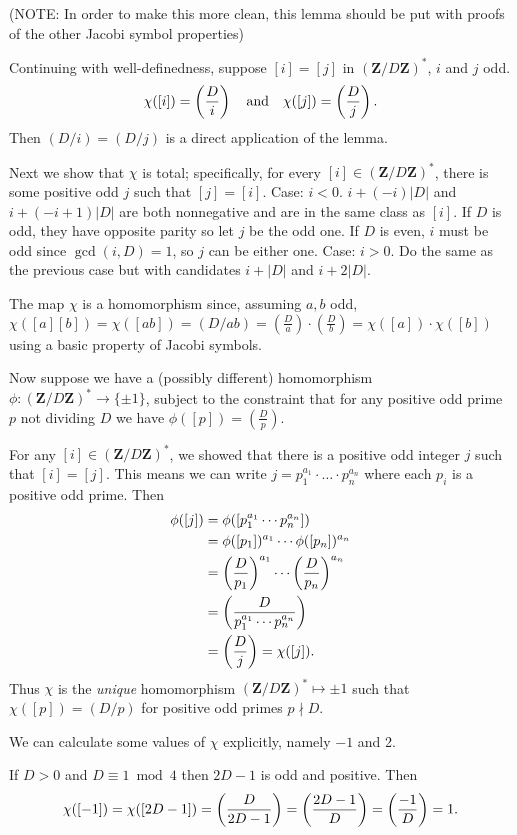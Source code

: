 (NOTE: In order to make this more clean, this lemma should be put with proofs of the other Jacobi symbol properties)

Continuing with well-definedness, suppose $[i] = [j]$ in $(\mathbf{Z}/D\mathbf{Z})^*$, $i$ and $j$ odd.
\[\chi([i])=\left(\frac{D}{i}\right)\quad\text{and}\quad\chi([j])=\left(\frac{D}{j}\right).\] Then $(D/i)=(D/j)$ is a direct application of the lemma.

Next we show that $\chi$ is total; specifically, for every $[i]\in (\mathbf{Z}/D\mathbf{Z})^*$, there is some positive odd $j$ such that $[j] = [i]$.
  Case: $i < 0$. $i+(-i)|D|$ and $i+(-i+1)|D|$ are both nonnegative and are in the same class as $[i]$. If $D$ is odd, they have opposite parity so let $j$ be the odd one. If $D$ is even, $i$ must be odd since $\gcd(i,D)=1$, so $j$ can be either one.
  Case: $i > 0$. Do the same as the previous case but with candidates $i+|D|$ and $i+2|D|$.

The map $\chi$ is a homomorphism since, assuming $a,b$ odd, $\chi([a][b]) = \chi([ab]) = (D/ab) = (\frac{D}{a})\cdot(\frac{D}{b}) = \chi([a])\cdot\chi([b])$ using a basic property of Jacobi symbols.

Now suppose we have a (possibly different) homomorphism
$\phi:(\mathbf{Z}/D\mathbf{Z})^*\to\{\pm 1\}$, subject to the constraint that for any positive odd prime $p$ not dividing $D$ we have
  $\phi([p]) = (\frac{D}{p})$.

For any $[i]\in (\mathbf{Z}/D\mathbf{Z})^*$, we showed that there is a positive odd integer $j$ such that $[i] = [j]$. This means we can write $j=p_1^{a_1}\cdot\ldots\cdot p_n^{a_n}$ where each $p_i$ is a positive odd prime. Then
\begin{align*}
\phi([j]) &= \phi([p_1^{a_1}\cdots p_n^{a_n}])\\
       &= \phi([p_1])^{a_1}\cdots \phi([p_n])^{a_n}\\
       &= \left(\frac{D}{p_1}\right)^{a_1}\cdots\left(\frac{D}{p_n}\right)^{a_n}\\
       &= \left(\frac{D}{p_1^{a_1}\cdots p_n^{a_n}}\right)\\
       &= \left(\frac{D}{j}\right) = \chi([j]).
\end{align*}
Thus $\chi$ is the \emph{unique} homomorphism
$(\mathbf{Z}/D\mathbf{Z})^* \mapsto {\pm 1}$
such that $\chi([p]) = (D/p)$ for positive odd primes $p\nmid D$.

We can calculate some values of $\chi$ explicitly, namely $-1$ and 2.

If $D>0$ and $D\equiv 1\bmod 4$ then $2D-1$ is odd and positive. Then
\[\chi([-1])=\chi([2D-1])=\left(\frac{D}{2D-1}\right)=\left(\frac{2D-1}{D}\right)=\left(\frac{-1}{D}\right)=1.\]

